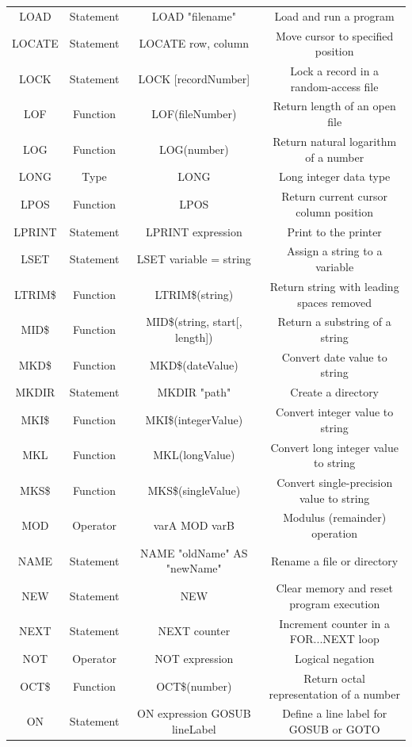 \documentclass[10pt, reqno]{exam}
\begin{document}
{\begin{longtable}{|c|c|c|c|}
    LOAD & Statement & LOAD "filename" & Load and run a program \\
    LOCATE & Statement & LOCATE row, column & Move cursor to specified position \\
    LOCK & Statement & LOCK [recordNumber] & Lock a record in a random-access file \\
    LOF & Function & LOF(fileNumber) & Return length of an open file \\
    LOG & Function & LOG(number) & Return natural logarithm of a number \\
    LONG & Type & LONG & Long integer data type \\
    LPOS & Function & LPOS & Return current cursor column position \\
    LPRINT & Statement & LPRINT expression & Print to the printer \\
    LSET & Statement & LSET variable = string & Assign a string to a variable \\
    LTRIM\$ & Function & LTRIM\$(string) & Return string with leading spaces removed \\
    MID\$ & Function & MID\$(string, start[, length]) & Return a substring of a string \\
    MKD\$ & Function & MKD\$(dateValue) & Convert date value to string \\
    MKDIR & Statement & MKDIR "path" & Create a directory \\
    MKI\$ & Function & MKI\$(integerValue) & Convert integer value to string \\
    MKL & Function & MKL(longValue) & Convert long integer value to string \\
    MKS\$ & Function & MKS\$(singleValue) & Convert single-precision value to string \\
    MOD & Operator & varA MOD varB & Modulus (remainder) operation \\
    NAME & Statement & NAME "oldName" AS "newName" & Rename a file or directory \\
    NEW & Statement & NEW & Clear memory and reset program execution \\
    NEXT & Statement & NEXT counter & Increment counter in a FOR...NEXT loop \\
    NOT & Operator & NOT expression & Logical negation \\
    OCT\$ & Function & OCT\$(number) & Return octal representation of a number \\
    ON & Statement & ON expression GOSUB lineLabel & Define a line label for GOSUB or GOTO \\

\end{longtable}}
\end{document}
